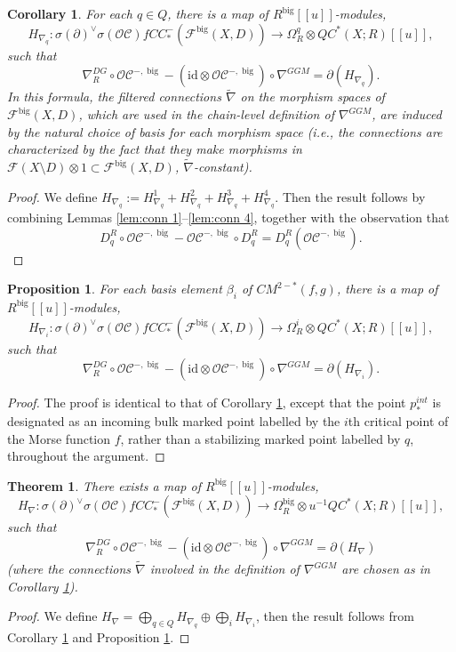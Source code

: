 \documentclass{article}
\newtheorem{thm}[lem]{Theorem}
\newtheorem{cor}[lem]{Corollary}
\newtheorem{prop}[lem]{Proposition}
\def\fuk{\EuF}
\def\cO{\mathcal{O}}
\def\cC{\mathcal{C}}
\def\fuk{\mathcal{F}}
\def\id{\mathrm{id}}
\def\big{{\operatorname{big}}}
\begin{document}
\begin{cor}
    \label{cor:oc_conn}
    For each $q \in Q$, there is a map of $R^\big[[u]]$-modules,
    $$H_{\nabla_q}: \sigma(\partial)^\vee\sigma(\cO\cC) fCC_*^-(\fuk^\big(X,D)) \to \Omega^q_R \otimes QC^*(X;R)[[u]],$$
    such that
    $$ \nabla^{DG}_R \circ \cO\cC^{-,\big} - (\id \otimes \cO\cC^{-,\big}) \circ \nabla^{GGM}  = \partial ( H_{\nabla_q}).$$
    In this formula, the filtered connections $\tilde \nabla$ on the morphism spaces of $\fuk^\big(X,D)$, which are used in the chain-level definition of $\nabla^{GGM}$, are induced by the natural choice of basis for each morphism space (i.e., the connections are characterized by the fact that they make morphisms in $\fuk(X \setminus D) \otimes 1 \subset \fuk^\big(X,D)$, $\tilde \nabla$-constant).
\end{cor}
\begin{proof}
    We define $H_{\nabla_q} := H^1_{\nabla_q} + H^2_{\nabla_q} + H^3_{\nabla_q} + H^4_{\nabla_q}$. 
    Then the result follows by combining Lemmas \ref{lem:conn 1}--\ref{lem:conn 4}, together with the observation that
    $$D_q^R \circ \cO\cC^{-,\big} - \cO\cC^{-,\big} \circ D_q^R = D_q^R(\cO\cC^{-,\big}).$$
\end{proof}

\begin{prop}\label{prop:h nabla i}
    For each basis element $\beta_i$ of $CM^{2-*}(f,g)$, there is a map of $R^\big[[u]]$-modules,
    $$H_{\nabla_i}: \sigma(\partial)^\vee\sigma(\cO\cC) fCC_*^-(\fuk^\big(X,D)) \to \Omega^i_R \otimes QC^*(X;R)[[u]],$$
    such that
    $$ \nabla^{DG}_R \circ \cO\cC^{-,\big} - (\id \otimes \cO\cC^{-,\big}) \circ \nabla^{GGM}  = \partial ( H_{\nabla_i}).$$
\end{prop}
\begin{proof}
    The proof is identical to that of Corollary \ref{cor:oc_conn}, except that the point $p_*^{int}$ is designated as an incoming bulk marked point labelled by the $i$th critical point of the Morse function $f$, rather than a stabilizing marked point labelled by $q$, throughout the argument. 
\end{proof}

\begin{thm}
    \label{thm:oc_conn}
    There exists a map of $R^\big[[u]]$-modules,
    $$H_\nabla: \sigma(\partial)^\vee\sigma(\cO\cC) fCC_*^-(\fuk^\big(X,D)) \to \Omega^\big_R \otimes u^{-1} QC^*(X;R)[[u]],$$
    such that
    $$ \nabla^{DG}_R \circ \cO\cC^{-,\big} - (\id \otimes \cO\cC^{-,\big}) \circ \nabla^{GGM} = \partial ( H_\nabla )$$
    (where the connections $\tilde \nabla$ involved in the definition of $\nabla^{GGM}$ are chosen as in Corollary \ref{cor:oc_conn}).
\end{thm}
\begin{proof}
    We define $H_\nabla = \bigoplus_{q \in Q} H_{\nabla_q} \oplus \bigoplus_i H_{\nabla_i}$, then the result follows from Corollary \ref{cor:oc_conn} and Proposition \ref{prop:h nabla i}.
\end{proof}
\end{document}
